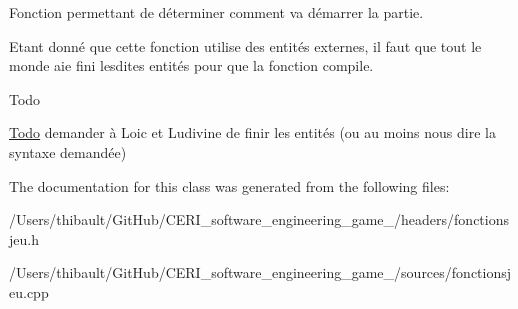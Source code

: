 Fonction permettant de déterminer comment va démarrer la partie. 

Etant donné que cette fonction utilise des entités externes, il faut que tout le monde aie fini lesdites entités pour que la fonction compile.

\begin{DoxyRefDesc}{Todo}
\item[\hyperlink{todo__todo000001}{Todo}]demander à Loic et Ludivine de finir les entités (ou au moins nous dire la syntaxe demandée) \end{DoxyRefDesc}


The documentation for this class was generated from the following files\+:\begin{DoxyCompactItemize}
\item 
/\+Users/thibault/\+Git\+Hub/\+C\+E\+R\+I\+\_\+software\+\_\+engineering\+\_\+game\+\_/headers/fonctionsjeu.\+h\item 
/\+Users/thibault/\+Git\+Hub/\+C\+E\+R\+I\+\_\+software\+\_\+engineering\+\_\+game\+\_/sources/fonctionsjeu.\+cpp\end{DoxyCompactItemize}
